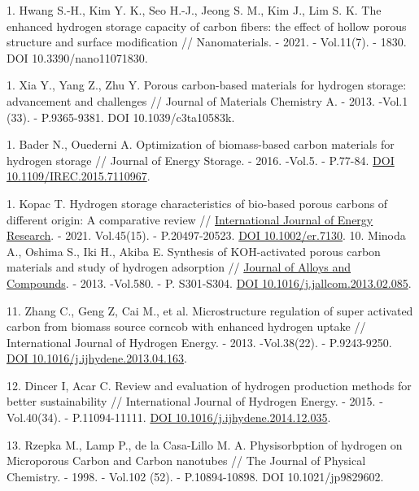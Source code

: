 1. Hwang S.-H., Kim Y. K., Seo H.-J., Jeong S. M., Kim J., Lim S. K. The
enhanced hydrogen storage capacity of carbon fibers: the effect of
hollow porous structure and surface modification // Nanomaterials. -
2021. - Vol.11(7). - 1830. DOI 10.3390/nano11071830.

1. Xia Y., Yang Z., Zhu Y. Porous carbon-based materials for hydrogen
storage: advancement and challenges // Journal of Materials Chemistry
A. - 2013. -Vol.1 (33). - P.9365-9381. DOI 10.1039/c3ta10583k.

1. Bader N., Ouederni A. Optimization of biomass-based carbon materials
for hydrogen storage // Journal of Energy Storage. - 2016. -Vol.5. -
P.77-84. \href{https://doi.org/10.1016/j.est.2015.12.009}{DOI
\href{http://dx.doi.org/10.1109/IREC.2015.7110967}{10.1109/IREC.2015.7110967}}.

1. Kopac T. Hydrogen storage characteristics of bio-based porous carbons
of different origin: A comparative review //
\href{https://onlinelibrary.wiley.com/journal/1099114x}{International
Journal of Energy Research}. - 2021. Vol.45(15). - P.20497-20523.
\href{https://doi.org/10.1002/er.7130}{DOI 10.1002/er.7130}.
10. Minoda A., Oshima S., Iki H., Akiba E. Synthesis of KOH-activated
porous carbon materials and study of hydrogen adsorption //
\href{https://www.researchgate.net/journal/Journal-of-Alloys-and-Compounds-0925-8388?_tp=eyJjb250ZXh0Ijp7ImZpcnN0UGFnZSI6InB1YmxpY2F0aW9uIiwicGFnZSI6InB1YmxpY2F0aW9uIn19}{Journal
of Alloys and Compounds}. - 2013. -Vol.580. - P. S301-S304.
\href{https://doi.org/10.1016/j.jallcom.2013.02.085}{DOI
10.1016/j.jallcom.2013.02.085}.

11. Zhang C., Geng Z, Cai M., et al. Microstructure regulation of super
activated carbon from biomass source corncob with enhanced hydrogen
uptake // International Journal of Hydrogen Energy. - 2013. -Vol.38(22).
- P.9243-9250.
\href{https://doi.org/10.1016/j.ijhydene.2013.04.163}{DOI
10.1016/j.ijhydene.2013.04.163}.

12. Dincer I, Acar C. Review and evaluation of hydrogen production
methods for better sustainability // International Journal of Hydrogen
Energy. - 2015. -Vol.40(34). - P.11094-11111.
\href{https://doi.org/10.1016/j.ijhydene.2014.12.035}{DOI
10.1016/j.ijhydene.2014.12.035}.

13. Rzepka M., Lamp P., de la Casa-Lillo M. A. Physisorbption of hydrogen
on Microporous Carbon and Carbon nanotubes // The Journal of Physical
Chemistry. - 1998. - Vol.102 (52). - P.10894-10898. DOI
10.1021/jp9829602.

